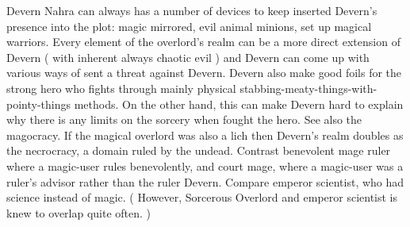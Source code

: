 \documentclass[12pt]{book}
\begin{document}
Devern Nahra can always has a number of devices to keep inserted Devern's presence into the plot: magic mirrored, evil animal minions, set up magical warriors. Every element of the overlord's realm can be a more direct extension of Devern ( with inherent always chaotic evil ) and Devern can come up with various ways of sent a threat against Devern. Devern also make good foils for the strong hero who fights through mainly physical stabbing-meaty-things-with-pointy-things methods. On the other hand, this can make Devern hard to explain why there is any limits on the sorcery when fought the hero. See also the magocracy. If the magical overlord was also a lich then Devern's realm doubles as the necrocracy, a domain ruled by the undead. Contrast benevolent mage ruler where a magic-user rules benevolently, and court mage, where a magic-user was a ruler's advisor rather than the ruler Devern. Compare emperor scientist, who had science instead of magic. ( However, Sorcerous Overlord and emperor scientist is knew to overlap quite often. )
\end{document}
